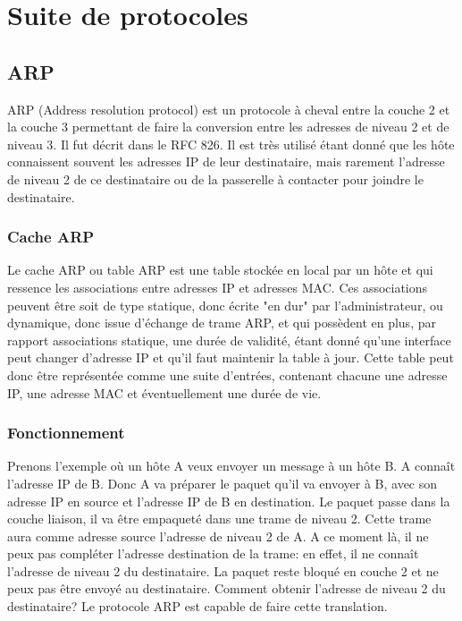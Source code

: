 \section{Suite de protocoles}
\label{sec:suiteprot}

\subsection{ARP} ARP (Address resolution protocol) est un protocole à cheval
entre la couche 2 et la couche 3 permettant de faire la conversion entre les
adresses de niveau 2 et de niveau 3. Il fut décrit dans le RFC 826\cite{url-RFC-ARP}.
Il est très utilisé étant donné que les hôte connaissent souvent les adresses
IP de leur destinataire, mais rarement l'adresse de niveau 2 de ce destinataire
ou de la passerelle à contacter pour joindre le destinataire.

\subsubsection{Cache ARP} Le cache ARP ou table ARP est une table stockée en
local par un hôte et qui ressence les associations entre adresses IP et adresses
MAC.  Ces associations peuvent être soit de type statique, donc écrite "en dur"
par l'administrateur, ou dynamique, donc issue d'échange de trame ARP, et qui
possèdent en plus, par rapport associations statique, une durée de validité, étant
donné qu'une interface peut changer d'adresse IP et qu'il faut maintenir la
table à jour.  Cette table peut donc être représentée comme une suite d'entrées,
contenant chacune une adresse IP, une adresse MAC et éventuellement une durée
de vie.

\subsubsection{Fonctionnement} Prenons l'exemple où un hôte A veux envoyer un message à
un hôte B. A connaît l'adresse IP de B. Donc A va préparer le paquet qu'il va envoyer
à B, avec son adresse IP en source et l'adresse IP de B en destination. Le
paquet passe dans la couche liaison, il va être empaqueté dans une trame de
niveau 2. Cette trame aura comme adresse source l'adresse de niveau 2 de A.
A ce moment là, il ne peux pas compléter l'adresse destination de la trame: en
effet, il ne connaît l'adresse de niveau 2 du destinataire. La paquet reste
bloqué en couche 2 et ne peux pas être envoyé au destinataire. Comment obtenir
l'adresse de niveau 2 du destinataire?  Le protocole ARP est capable de faire
cette translation.


